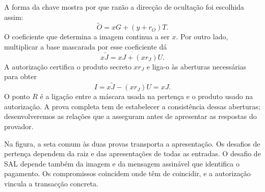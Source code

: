 A forma da chave mostra por que razão a direcção de ocultação foi
escolhida assim:
\[
 \widetilde O=xG+(y+r_O)T.
\]
O coeficiente que determina a imagem continua a ser \(x\). Por
outro lado, multiplicar a base mascarada por esse coeficiente dá
\[
 x\widetilde J=xJ+(xr_J)U.
\]
A autorização certifica o produto secreto \(xr_J\) e liga-o às
aberturas necessárias para obter
\begin{equation}
 I=x\widetilde J-(xr_J)U=xJ.
 \label{eq:fcmp-image-cancellation}
\end{equation}
O ponto \(R\) é a ligação entre a máscara usada na pertença e
o produto usado na autorização. A prova completa tem de estabelecer
a consistência dessas aberturas; desenvolveremos as relações que
a asseguram antes de apresentar as respostas do provador.

\begin{center}
\end{center}

Na figura, a seta comum às duas provas transporta a apresentação.
Os desafios de pertença dependem da raiz e das apresentações de
todas as entradas. O desafio de SAL depende também da imagem e
da mensagem assinável que identifica o pagamento. Os compromissos
coincidem onde têm de coincidir, e a autorização vincula a
transacção concreta.

